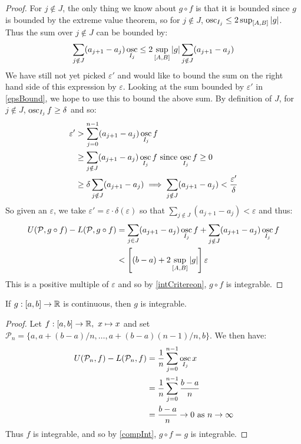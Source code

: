 \documentclass[../main.tex]{subfiles}
\begin{document}
\begin{proof}
  For $j \notin J$, the only thing we know about $g \circ f$ is that it is bounded since $g$ is bounded by the extreme value theorem, so for $j \notin J$, $\operatorname*{osc}_{I_j} \leq 2 \sup_{[A, B]} |g|$.
  Thus the sum over $j \notin J$ can be bounded by:
  \begin{align*}
    \sum_{j \notin J} (a_{j + 1} - a_j) \operatorname*{osc}_{I_j} \leq 2 \sup_{[A, B]} |g| \sum_{j \notin J} (a_{j + 1} - a_j)
  \end{align*}
  We have still not yet picked $\varepsilon'$ and would like to bound the sum on the right hand side of this expression by $\varepsilon$.
  Looking at the sum bounded by $\varepsilon'$ in \cref{epsBound}, we hope to use this to bound the above sum.
  By definition of $J$, for $j \notin J$, $\operatorname*{osc}_{I_j} f \geq \delta$ and so:
  \begin{align*}
    \varepsilon' &> \sum_{j = 0}^{n - 1} (a_{j + 1} - a_j) \operatorname*{osc}_{I_j} f \\
                &\geq \sum_{j \notin J} (a_{j + 1} - a_j) \operatorname*{osc}_{I_j} f \text{ since $\operatorname*{osc}_{I_j} f \geq 0$} \\
                &\geq \delta \sum_{j \notin J} (a_{j + 1} - a_j)
    \implies \sum_{j \notin J} (a_{j + 1} - a_j) < \frac{\varepsilon'}{\delta}
  \end{align*}
  So given an $\varepsilon$, we take $\varepsilon' = \varepsilon \cdot \delta(\varepsilon)$ so that $\sum_{j \notin J} (a_{j + 1} - a_j) < \varepsilon$ and thus:
  \begin{align*}
    U(\mathcal{P}, g \circ f) - L(\mathcal{P}, g \circ f) &= \sum_{j \in J} (a_{j + 1} - a_j) \operatorname*{osc}_{I_j} f + \sum_{j \notin J} (a_{j + 1} - a_j) \operatorname*{osc}_{I_j} f \\
                                                          &< \left[(b - a) + 2 \sup_{[A, B]} |g|\right] \varepsilon
  \end{align*}
  This is a positive multiple of $\varepsilon$ and so by \cref{intCritereon}, $g \circ f$ is integrable.
\end{proof}
\begin{corollary}
  If $g: [a, b] \to \mathbb{R}$ is continuous, then $g$ is integrable.
\end{corollary}
\begin{proof}
  Let $f: [a, b] \to \mathbb{R},\ x \mapsto x$ and set $\mathcal{P}_n = \{a, a + (b - a)/n, \ldots, a + (b - a)(n - 1)/n, b\}$.
  We then have:
  \begin{align*}
    U(\mathcal{P}_n, f) - L(\mathcal{P}_n, f) &= \frac{1}{n}\sum_{j = 0}^{n - 1} \operatorname*{osc}_{I_j} x \\
                                              &= \frac{1}{n} \sum_{j = 0}^{n - 1} \frac{b - a}{n} \\
                                              &= \frac{b - a}{n} \to 0 \text{ as } n \to \infty
  \end{align*}
  Thus $f$ is integrable, and so by \cref{compInt}, $g \circ f = g$ is integrable.
\end{proof}
\end{document}
